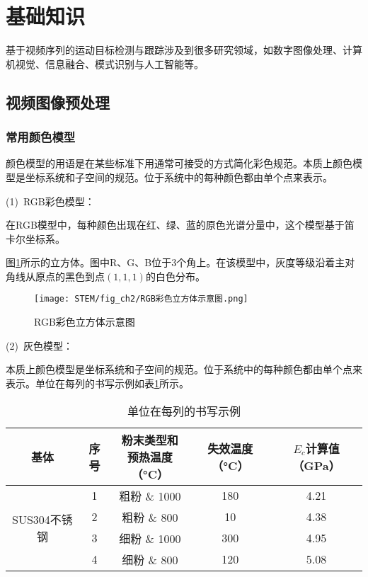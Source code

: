 
\section{基础知识}

基于视频序列的运动目标检测与跟踪涉及到很多研究领域，如数字图像处理、计算机视觉、信息融合、模式识别与人工智能等。

\subsection{视频图像预处理}

\subsubsection{常用颜色模型}

颜色模型的用语是在某些标准下用通常可接受的方式简化彩色规范。本质上颜色模型是坐标系统和子空间的规范。位于系统中的每种颜色都由单个点来表示。

(1)~RGB彩色模型：

在RGB模型中，每种颜色出现在红、绿、蓝的原色光谱分量中，这个模型基于笛卡尔坐标系。

图\ref{fig:RGB彩色立方体示意图}所示的立方体。图中R、G、B位于$3$个角上。在该模型中，灰度等级沿着主对角线从原点的黑色到点$(1,1,1)$的白色分布。
\begin{figure}[H]
  \centering
  \texttt{[image: STEM/fig\_ch2/RGB彩色立方体示意图.png]}
  \caption{RGB彩色立方体示意图}
  \label{fig:RGB彩色立方体示意图}
\end{figure}

(2)~灰色模型：

本质上颜色模型是坐标系统和子空间的规范。位于系统中的每种颜色都由单个点来表示。单位在每列的书写示例如表\ref{tab:单位在每列的书写示例}所示。

\begin{table}[H]
  \centering
  \caption{单位在每列的书写示例}
    \begin{tabular}{ccccc}
    \toprule
    基体 & 序号 & \makecell[c]{粉末类型和\\ 预热温度（\unit{\degreeCelsius}）} & 失效温度（\unit{\degreeCelsius}） & $E_c$计算值（\unit{\GPa}）\\
    \midrule
    \multicolumn{1}{c}{\multirow{4}[2]{*}{SUS304不锈钢}} & 1     & 粗粉 \& 1000 & 180   & 4.21 \\
          & 2     & 粗粉 \& 800 & 10    & 4.38 \\
          & 3     & 细粉 \& 1000 & 300   & 4.95 \\
          & 4     & 细粉 \& 800 & 120   & 5.08 \\
    \bottomrule
    \end{tabular}%
  \label{tab:单位在每列的书写示例}%
\end{table}%

